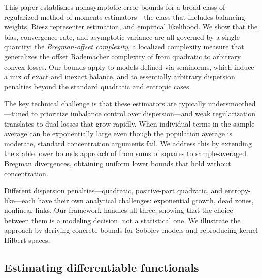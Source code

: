 \documentclass{article}
\begin{document}
This paper establishes nonasymptotic error bounds
for a broad class of regularized method-of-moments estimators---the
class that includes balancing weights,
Riesz representer estimation,
and empirical likelihood.
We show that the bias, convergence rate,
and asymptotic variance
are all governed by a single quantity:
the \emph{Bregman-offset complexity},
a localized complexity measure
that generalizes the offset Rademacher complexity
of \citet{liang2015learning}
from quadratic to arbitrary convex losses.
Our bounds apply to models defined
via seminorms,
which induce a mix of exact and inexact balance,
and to essentially arbitrary dispersion penalties
beyond the standard quadratic and entropic cases.

The key technical challenge is
that these estimators are typically undersmoothed---tuned
to prioritize imbalance control
over dispersion---and
weak regularization translates
to dual losses that grow rapidly.
When individual terms in the sample average
can be exponentially large
even though the population average is moderate,
standard concentration arguments fail.
We address this by extending
the stable lower bounds approach
of \citet{mendelson2021extending}
from sums of squares
to sample-averaged Bregman divergences,
obtaining uniform lower bounds
that hold without concentration.

Different dispersion penalties---quadratic,
positive-part quadratic,
and entropy-like---each
have their own analytical challenges:
exponential growth, dead zones, nonlinear links.
Our framework handles all three,
showing that the choice between them
is a modeling decision, not a statistical one.
We illustrate the approach by deriving
concrete bounds for Sobolev models
and reproducing kernel Hilbert spaces.

\subsection{Estimating differentiable functionals}
\label{sec:estimation-problem}
\end{document}
